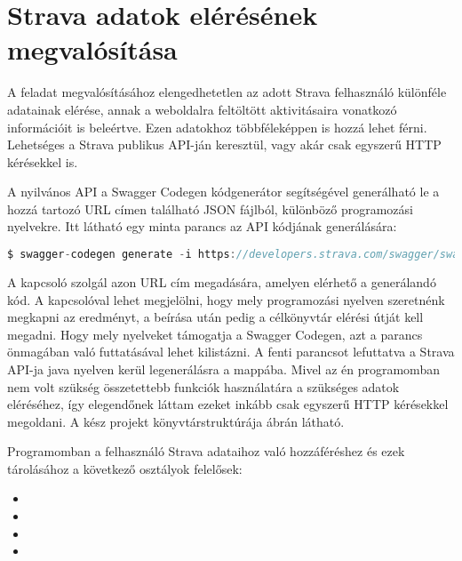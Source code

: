 \section{Strava adatok elérésének megvalósítása}

A feladat megvalósításához elengedhetetlen az adott Strava felhasználó különféle adatainak elérése, annak a weboldalra feltöltött aktivitásaira vonatkozó információit is beleértve.
Ezen adatokhoz többféleképpen is hozzá lehet férni.
Lehetséges a Strava publikus API-ján keresztül, vagy akár csak egyszerű HTTP kérésekkel is. 

A nyilvános API a Swagger Codegen kódgenerátor segítségével generálható le a hozzá tartozó URL címen található JSON fájlból, különböző programozási nyelvekre.\cite{strava}
Itt látható egy minta parancs az API kódjának generálására: 

\begin{lstlisting}[language=Java]
$ swagger-codegen generate -i https://developers.strava.com/swagger/swagger.json -l java -o generated/java 
\end{lstlisting}

A  kapcsoló szolgál azon URL cím megadására, amelyen elérhető a generálandó kód.
A  kapcsolóval lehet megjelölni, hogy mely programozási nyelven szeretnénk megkapni az eredményt, a  beírása után pedig a célkönyvtár elérési útját kell megadni.
Hogy mely nyelveket támogatja a Swagger Codegen, azt a  parancs önmagában való futtatásával lehet kilistázni.
A fenti parancsot lefuttatva a Strava API-ja java nyelven kerül legenerálásra a  mappába.
Mivel az én programomban nem volt szükség összetettebb funkciók használatára a szükséges adatok eléréséhez, így elegendőnek láttam ezeket inkább csak egyszerű HTTP kérésekkel megoldani.
A kész projekt könyvtárstruktúrája  ábrán látható.



Programomban a felhasználó Strava adataihoz való hozzáféréshez és ezek tárolásához a következő osztályok felelősek: 

\begin{itemize}
\setlength\itemsep{0em}
\item {}
\item {}
\item {}
\item {}
\end{itemize}
 

